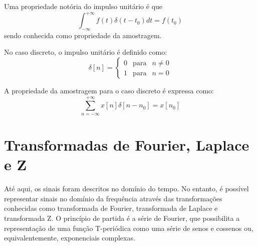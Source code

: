 \documentclass[12pt,a4paper]{report}
\begin{document}
  Uma propriedade notória do impulso unitário é que
  \begin{equation}
    \int_{-\infty}^{+\infty} f(t) \delta(t-t_0) dt = f(t_0)
  \end{equation}
  sendo conhecida como propriedade da amostragem.

  No caso discreto, o impulso unitário é definido como:
  \begin{equation}
    \delta[n] =
      \left
      \{
      \begin{array}{rcl}
        0 & \mbox{para} & n \neq 0 \\
        1 & \mbox{para} & n = 0
      \end{array}
      \right.
  \end{equation}

  A propriedade da amostragem para o caso discreto é expressa como:
  \begin{equation}
    \sum_{n = -\infty}^{+\infty} x[n] \delta[n-n_0] = x[n_0]
  \end{equation}

\section{Transformadas de Fourier, Laplace e Z}
  Até aqui, os sinais foram descritos no domínio do tempo. No entanto, é possível representar sinais no
  domínio da frequência através das transformações conhecidas como transformada de Fourier, transformada de
  Laplace e transformada Z. O princípio de partida é a série de Fourier, que possibilita a representação de uma
  função T-periódica como uma série de senos e cossenos ou, equivalentemente, exponenciais complexas.
\end{document}
